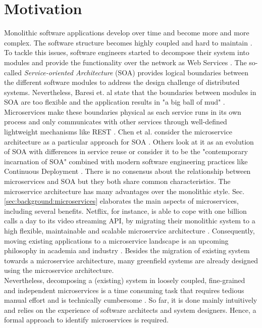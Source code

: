\section{Motivation}
\label{sec:Introduction:Motivation}
Monolithic software applications develop over time and become more and more complex. The software structure becomes highly coupled and hard to maintain \cite{MigratingTowardsSurvey}. To tackle this issues, software engineers started to decompose their system into modules and provide the functionality over the network as Web Services \cite{ServiceCutter}. The so-called \textit{Service-oriented Architecture} (SOA) provides logical boundaries between the different software modules to address the design challenge of distributed systems. Nevertheless, Baresi et. al state that the boundaries between modules in SOA are too flexible and the application results in "a big ball of mud" \cite{interfaceAnalysisBaresi}. Microservices make these boundaries physical as each service runs in its own process and only communicates with other services through well-defined lightweight mechanisms like REST \cite{FunctionalDecompositionHeinrich}. Chen et al. consider the microservice architecture as a particular approach for SOA \cite{DataflowDrivenChen}. Others look at it as an evolution of SOA with differences in service reuse \cite{interfaceAnalysisBaresi} or consider it to be the "contemporary incarnation of SOA" combined with modern software engineering practices like Continuous Deployment \cite{ServiceCutter}. There is no consensus about the relationship between microservices and SOA but they both share common characteristics.
The microservice architecture has many advantages over the monolithic style. Sec.\ref{sec:background:microservices} elaborates the main aspects of microservices, including several benefits. Netflix, for instance, is able to cope with one billion calls a day to its video streaming API, by migrating their monolithic system to a high flexible, maintainable and scalable microservice architecture \cite{DataflowDrivenChen}. Consequently, moving existing applications to a microservice landscape is an upcoming philosophy in academia and industry \cite{ObjectAwareAmiri}. Besides the migration of existing system towards a microservice architecture, many greenfield systems are already designed using the microservice architecture.\\
Nevertheless, decomposing a (existing) system in loosely coupled, fine-grained and independent microservices is a time consuming task that requires tedious manual effort \cite{ServiceCutter} and is technically cumbersome \cite{HeuristicsAlwis}. So far, it is done mainly intuitively and relies on the experience of software architects and system designers. Hence, a formal approach to identify microservices is required. 



